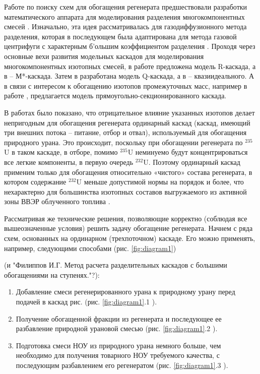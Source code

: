 Работе по поиску схем для обогащения регенерата предшествовали разработки математического аппарата для моделирования разделения многокомпонентных смесей \cite{delagarzaMulticomponentIsotopeSeparation1961}. Изначально, эта идея рассматривалась для газодиффузионного метода разделения, которая в последующем была адаптирована для метода газовой центрифуги с характерным б'ольшим коэффициентом разделения \cite{yamamotoMulticomponentIsotopeSeparating1978}.
Проходя через основные вехи развития модельных каскадов для моделирования многокомпонентных изотопных смесей, в работе \cite{delagarzaMulticomponentIsotopeSeparation1961} предложена модель R-каскада, а в \cite{levin1963} -- М*-каскада. Затем в \cite{minenkoTeoriiKaskadovDlya1965} разработана модель Q-каскада, а в \cite{sazykinKvaziidealnyeKaskadyDlya2000} -- квазиидеального. А в связи с интересом к обогащению изотопов промежуточных масс, например в работе \cite{kolokoltsovDesignCascadesSeparating1970}, предлагается модель прямоугольно-секционированного каскада.


В работах \cite{sulaberidzeNekotoryhRazdelitelnyhProblemah2004,sulaberidzeProblemsRefinementRecycled4, smirnovKaskadnyeShemyZadachah2012} было показано, что отрицательное влияние указанных изотопов делает непригодным для обогащения регенерата ординарный каскад (каскад, имеющий три внешних потока – питание, отбор и отвал), используемый для обогащения природного урана. Это происходит, поскольку при обогащении регенерата по $^{235}$U в таком каскаде, в отборе, помимо $^{235}$U неминуемо будут концентрироваться все легкие компоненты, в первую очередь $^{232}$U. Поэтому ординарный каскад применим только для обогащения относительно «чистого» состава регенерата, в котором содержание $^{232}$U меньше допустимой нормы на порядок и более, что нехарактерно для большинства изотопных составов выгружаемого из активной зоны ВВЭР облученного топлива \cite{bormanTehnikoekonomicheskiyAnalizVozmozhnyh2012}.

Рассматривая же технические решения, позволяющие корректно (соблюдая все вышеозначенные условия) решить задачу обогащение регенерата. Начнем с ряда схем, основанных на ординарном (трехпоточном) каскаде.
Его можно применять, например, следующими способами (рис. \ref{fig:diagram1}) \cite{smirnovKaskadnyeShemyZadachah2012}

(и "Филиппов И.Г. Метод расчета разделительных каскадов с большими обогащениями на ступенях."?):
\begin{enumerate}
  \item Добавление смеси регенерированного урана к природному урану перед подачей в каскад рис. (рис. \ref{fig:diagram1}.1 ).
  \item Получение обогащенной фракции из регенерата и последующее ее разбавление природной урановой смесью (рис. \ref{fig:diagram1}.2 ).
  \item Подготовка смеси НОУ из природного урана немного больше, чем необходимо для получения товарного НОУ требуемого качества, с последующим разбавлением его регенератом (рис. \ref{fig:diagram1}.3 ).
\end{enumerate}

